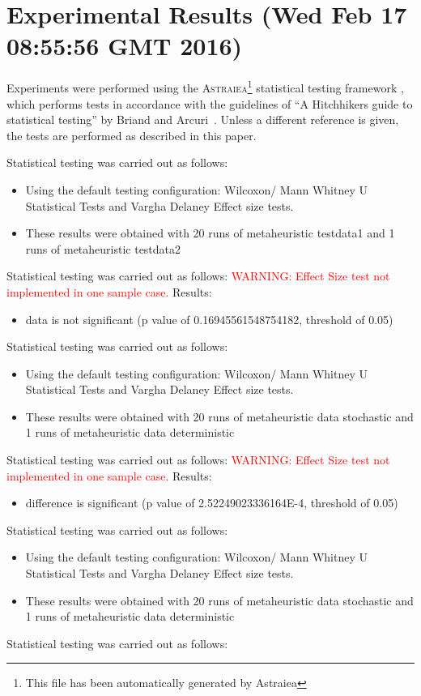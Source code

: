 \documentclass[]{article}
\begin{document}
\section{Experimental Results (Wed Feb 17 08:55:56 GMT 2016)}
Experiments were performed using the \textsc{Astraiea}\footnote{This file has been automatically generated by Astraiea} statistical testing framework \cite{Neumann:2014:EET:2598394.2609850},
which performs tests in accordance with the guidelines of ``A Hitchhikers guide to statistical testing''
by Briand and Arcuri~\cite{Arcuri2012}.
Unless a different reference is given, the tests are performed as described in this paper.

Statistical testing was carried out as follows: \begin{itemize}
\item{Using the default testing configuration: Wilcoxon/ Mann Whitney U Statistical Tests and Vargha Delaney Effect size tests.}
\item{These results were obtained with 20 runs of metaheuristic testdata1 and 1 runs of metaheuristic testdata2}
\end{itemize}Statistical testing was carried out as follows: 
\textcolor{Red}{WARNING: Effect Size test not implemented in one sample case.
}
Results:
\begin{itemize}
\item{data is not significant (p value of 0.16945561548754182, threshold of 0.05)}
\end{itemize}Statistical testing was carried out as follows: \begin{itemize}
\item{Using the default testing configuration: Wilcoxon/ Mann Whitney U Statistical Tests and Vargha Delaney Effect size tests.}
\item{These results were obtained with 20 runs of metaheuristic data stochastic and 1 runs of metaheuristic data deterministic}
\end{itemize}Statistical testing was carried out as follows: 
\textcolor{Red}{WARNING: Effect Size test not implemented in one sample case.
}
Results:
\begin{itemize}
\item{difference is significant (p value of 2.52249023336164E-4, threshold of 0.05)}
\end{itemize}Statistical testing was carried out as follows: \begin{itemize}
\item{Using the default testing configuration: Wilcoxon/ Mann Whitney U Statistical Tests and Vargha Delaney Effect size tests.}
\item{These results were obtained with 20 runs of metaheuristic data stochastic and 1 runs of metaheuristic data deterministic}
\end{itemize}Statistical testing was carried out as follows: 
\end{document}
